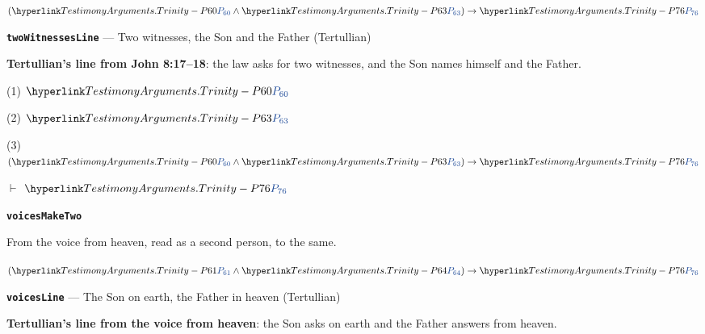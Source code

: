 \documentclass[11pt,paper=\testimonypaper,DIV=13,parskip=false]{scrartcl}
\begin{document}
\begin{derivation}
  \item[] \((\pvar{TestimonyArguments.Trinity}{60} \land \pvar{TestimonyArguments.Trinity}{63}) \rightarrow \pvar{TestimonyArguments.Trinity}{76}\)
\end{derivation}
\par\medskip\noindent\textbf{\texttt{two\allowbreak{}Witnesses\allowbreak{}Line}} --- Two witnesses, the Son and the Father (Tertullian)\par\nobreak\noindent
\textbf{Tertullian’s line from John 8:17–18}: the law asks for two witnesses, and the Son names himself and the Father.

\begin{derivation}
  \item[(1)] \(\pvar{TestimonyArguments.Trinity}{60}\)
  \item[(2)] \(\pvar{TestimonyArguments.Trinity}{63}\)
  \item[(3)] \((\pvar{TestimonyArguments.Trinity}{60} \land \pvar{TestimonyArguments.Trinity}{63}) \rightarrow \pvar{TestimonyArguments.Trinity}{76}\)
  \item[\(\vdash\)] \(\pvar{TestimonyArguments.Trinity}{76}\)
\end{derivation}
\par\medskip\noindent\textbf{\texttt{voices\allowbreak{}Make\allowbreak{}Two}}\par\nobreak\noindent
From the voice from heaven, read as a second person, to the same.

\begin{derivation}
  \item[] \((\pvar{TestimonyArguments.Trinity}{61} \land \pvar{TestimonyArguments.Trinity}{64}) \rightarrow \pvar{TestimonyArguments.Trinity}{76}\)
\end{derivation}
\par\medskip\noindent\textbf{\texttt{voices\allowbreak{}Line}} --- The Son on earth, the Father in heaven (Tertullian)\par\nobreak\noindent
\textbf{Tertullian’s line from the voice from heaven}: the Son asks on earth and the Father answers from heaven.
\end{document}
